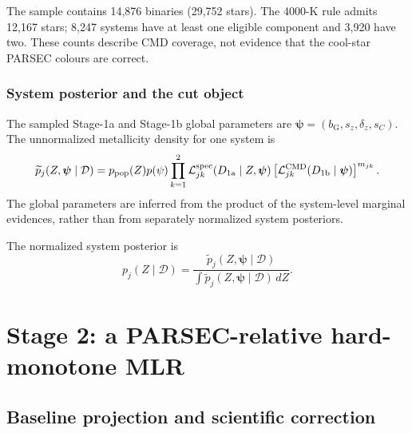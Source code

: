 The sample contains 14,876 binaries (29,752 stars).  The 4000-K rule
admits 12,167 stars; 8,247 systems have at least one eligible component and
3,920 have two.  These counts describe CMD coverage, not evidence that the
cool-star PARSEC colours are correct.

\subsubsection{System posterior and the cut object}

The sampled Stage-1a and Stage-1b global parameters are 
$\bm\psi=(b_{\mathrm{G}},s_z,\delta_z,s_C)$.  The unnormalized metallicity density for one system is
\begin{equation}
 \widetilde p_j(Z,\bm\psi \mid \mathcal{D})
 =p_{\rm pop}(Z) p(\psi)
 \prod_{k=1}^{2}\mathcal{L}^{\rm spec}_{jk}
 (D_{\rm 1a}\mid Z,\bm\psi)
 \left[\mathcal{L}^{\rm CMD}_{jk}(D_{\rm 1b}\mid \bm\psi)\right]^{m_{jk}}.
 \label{eq:zpost-cont}
\end{equation}
The global parameters are inferred from the product of the system-level marginal evidences, rather than from separately normalized system posteriors.

The normalized system posterior is
\begin{equation}
 p_j(Z\mid\mathcal{D})=\dfrac{\widetilde p_j(Z,\bm\psi\mid\mathcal{D})}
 {\int{\widetilde p_j(Z,\bm\psi\mid\mathcal{D})\,dZ}}.
 \label{eq:zpost}
\end{equation}   

\section{Stage 2: a PARSEC-relative hard-monotone MLR}
\label{sec:mlr}

\subsection{Baseline projection and scientific correction}

